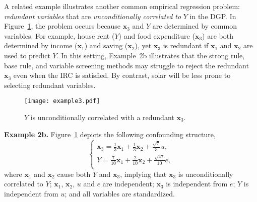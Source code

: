 \documentclass[11pt,review,authoryear]{elsarticle}
\begin{document}
\medskip

A related example illustrates another common empirical regression problem: \emph{redundant variables} that are \emph{unconditionally correlated to} $Y$ in the DGP. In Figure~\ref{fig:cond_example}, the problem occurs because $\mathbf{x}_3$ and $Y$ are determined by common variables. For example, house rent ($Y$) and food expenditure ($\mathbf{x}_3$) are both determined by income ($\mathbf{x}_1$) and saving ($\mathbf{x}_2$), yet $\mathbf{x}_3$ is redundant if $\mathbf{x}_1$ and $\mathbf{x}_2$ are used to predict $Y$. In this setting, Example~2b illustrates that the strong rule, base rule, and variable screening methods may struggle to reject the redundant $\mathbf{x}_3$ even when the IRC is satisfied. By contrast, solar will be less prone to selecting redundant variables.

\begin{figure}[ht]
    \centering
    \texttt{[image: example3.pdf]}
    \caption{$Y$ is unconditionally correlated with a redundant $\mathbf{x}_3$.}
    \label{fig:cond_example}
  \end{figure}

\smallskip
\noindent
\textbf{Example 2b.} Figure~\ref{fig:cond_example} depicts the following confounding structure,
%
\begin{equation}
	\begin{cases}
    \mathbf{x}_3 = \frac{1}{3} \mathbf{x}_1 + \frac{1}{3} \mathbf{x}_2 + \frac{\sqrt{7}}{3} u, \\
    Y = \frac{7}{10} \mathbf{x}_1 +  \frac{2}{10} \mathbf{x}_2 +  \frac{\sqrt{47}}{10} e, \\
	\end{cases}
	\label{eqn:example_4}
\end{equation}
%
where $\mathbf{x}_1$ and $\mathbf{x}_2$ cause both $Y$ and $\mathbf{x}_3$, implying that $\mathbf{x}_3$ is unconditionally correlated to $Y$; $\mathbf{x}_1$, $\mathbf{x}_2$, $u$ and $e$ are independent; $\mathbf{x}_3$ is independent from $e$; $Y$ is independent from $u$; and all variables are standardized.
\end{document}
